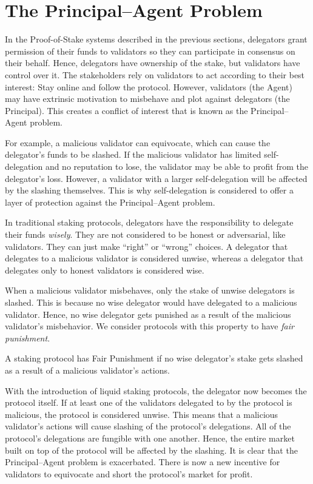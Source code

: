 \section{The Principal--Agent Problem}
In the Proof-of-Stake systems described in the previous sections,
delegators grant permission of their funds to validators so they can
participate in consensus on their behalf.
Hence, delegators have ownership of the stake, but
validators have control over it.
The stakeholders rely on validators to act according to their
best interest: Stay online and follow the protocol.
However, validators (the Agent) may have extrinsic motivation to
misbehave and plot against delegators (the Principal). This creates
a conflict of interest that is known as the Principal--Agent problem.

For example, a malicious validator can equivocate, which can cause
the delegator's funds to be slashed. If the malicious validator has
limited self-delegation and no reputation to lose, the validator
may be able to profit from the delegator's loss. However, a validator
with a larger self-delegation will be affected by the slashing themselves.
This is why self-delegation is considered to offer a layer of protection
against the Principal--Agent problem.

In traditional staking protocols, delegators have the responsibility to
delegate their funds \emph{wisely}.
They are not considered to be honest or adversarial, like validators.
They can just make ``right'' or ``wrong'' choices.
A delegator that delegates to a malicious validator is considered unwise,
whereas a delegator that delegates only to honest validators is
considered wise.

When a malicious validator misbehaves, only the stake of unwise delegators is slashed.
This is because no wise delegator would have delegated to a malicious
validator. Hence, no wise delegator gets punished as a result of
the malicious validator's misbehavior. We consider protocols with
this property to have \emph{fair punishment}.

\begin{definition}
    A staking protocol has Fair Punishment if no wise
    delegator's stake gets slashed as a result of a malicious validator's
    actions.
\end{definition}

With the introduction of liquid staking protocols, the delegator
now becomes the protocol itself. If at least one of the validators
delegated to by the protocol is malicious, the protocol is
considered unwise. This means that a malicious validator's actions
will cause slashing of the protocol's delegations.
All of the protocol's delegations are fungible with one another.
Hence, the entire market built on top of the protocol will be affected by
the slashing. It is clear that the Principal--Agent problem is exacerbated.
There is now a new incentive for validators to equivocate and short the
protocol's market for profit.

